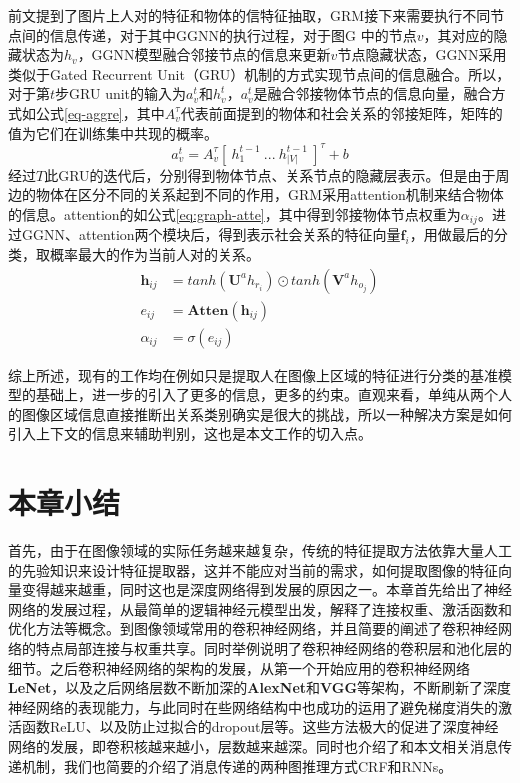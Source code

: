前文提到了图片上人对的特征和物体的信特征抽取，GRM接下来需要执行不同节点间的信息传递，对于其中GGNN的执行过程，对于图$\mathrm{G}$ 中的节点$v$，其对应的隐藏状态为$h_{v}$，GGNN模型融合邻接节点的信息来更新$v$节点隐藏状态，GGNN采用类似于Gated Recurrent Unit（GRU）\cite{cho2014learning}机制的方式实现节点间的信息融合。所以，对于第$t$步GRU unit的输入为$a_v^t$和$h_v^t$，$a_v^t$是融合邻接物体节点的信息向量，融合方式如公式\ref{eq-aggre}，其中$A_v^{\tau}$代表前面提到的物体和社会关系的邻接矩阵，矩阵的值为它们在训练集中共现的概率。
\begin{equation}\label{eq-aggre}
    a_v^t = A_{v}^{\tau}[~h_1^{t-1}~...~h_{|V|}^{t-1}~]^{\tau} + b
\end{equation}
经过$T$此GRU的迭代后，分别得到物体节点、关系节点的隐藏层表示。但是由于周边的物体在区分不同的关系起到不同的作用，GRM采用attention机制来结合物体的信息。attention的如公式\ref{eq:graph-atte}，其中得到邻接物体节点权重为$\alpha_{ij}$。进过GGNN、attention两个模块后，得到表示社会关系的特征向量$\mathbf{f}_{i}$，用做最后的分类，取概率最大的作为当前人对的关系。
\begin{equation}\label{eq:graph-atte}
    \begin{split}
        \mathbf{h}_{ij} &= tanh(\mathbf{U}^ah_{r_{i}}) \odot tanh(\mathbf{V}^ah_{o_{j}}) \\
        e_{ij} &= \mathbf{Atten}(\mathbf{h}_{ij}) \\
        \alpha_{ij} &= \sigma(e_{ij})
    \end{split}
\end{equation}

综上所述，现有的工作均在例如只是提取人在图像上区域的特征进行分类的基准模型的基础上，进一步的引入了更多的信息，更多的约束。直观来看，单纯从两个人的图像区域信息直接推断出关系类别确实是很大的挑战，所以一种解决方案是如何引入上下文的信息来辅助判别，这也是本文工作的切入点。

\section{本章小结}

首先，由于在图像领域的实际任务越来越复杂，传统的特征提取方法依靠大量人工的先验知识来设计特征提取器，这并不能应对当前的需求，如何提取图像的特征向量变得越来越重，同时这也是深度网络得到发展的原因之一。本章首先给出了神经网络的发展过程，从最简单的逻辑神经元模型出发，解释了连接权重、激活函数和优化方法等概念。到图像领域常用的卷积神经网络，并且简要的阐述了卷积神经网络的特点局部连接与权重共享。同时举例说明了卷积神经网络的卷积层和池化层的细节。之后卷积神经网络的架构的发展，从第一个开始应用的卷积神经网络\textbf{LeNet}，以及之后网络层数不断加深的\textbf{AlexNet}和\textbf{VGG}等架构，不断刷新了深度神经网络的表现能力，与此同时在些网络结构中也成功的运用了避免梯度消失的激活函数ReLU、以及防止过拟合的dropout层等。这些方法极大的促进了深度神经网络的发展，即卷积核越来越小，层数越来越深。同时也介绍了和本文相关消息传递机制，我们也简要的介绍了消息传递的两种图推理方式CRF和RNNs。

